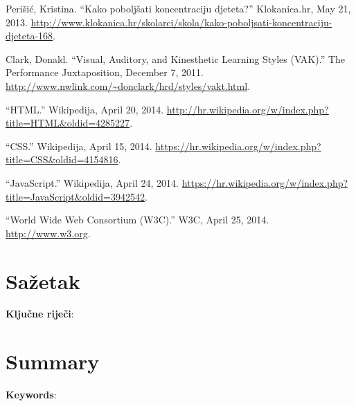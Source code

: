 \documentclass{scrreprt}
\begin{document}
\begin{thebibliography}{9}

   Perišić, Kristina. “Kako poboljšati koncentraciju djeteta?”
    Klokanica.hr, May 21, 2013.
    \url{http://www.klokanica.hr/skolarci/skola/kako-poboljsati-koncentraciju-djeteta-168}.

   Clark, Donald. “Visual, Auditory, and Kinesthetic Learning
    Styles (VAK).” The Performance Juxtaposition, December 7, 2011.
    \url{http://www.nwlink.com/~donclark/hrd/styles/vakt.html}.

   “HTML.” Wikipedija, April 20, 2014.
    \url{http://hr.wikipedia.org/w/index.php?title=HTML&oldid=4285227}.

   “CSS.” Wikipedija, April 15, 2014.
    \url{https://hr.wikipedia.org/w/index.php?title=CSS&oldid=4154816}.

   “JavaScript.” Wikipedija, April 24, 2014.
    \url{https://hr.wikipedia.org/w/index.php?title=JavaScript&oldid=3942542}.

   “World Wide Web Consortium (W3C).” W3C, April 25, 2014.
    \url{http://www.w3.org}.

\end{thebibliography}

\chapter{Sažetak}

\textbf{Ključne riječi}:

\chapter{Summary}

\textbf{Keywords}:
\end{document}
